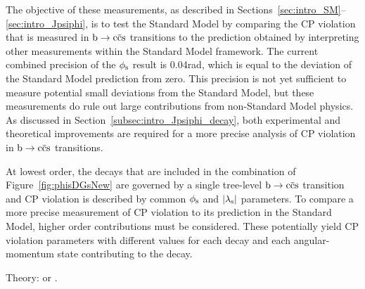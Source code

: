 The objective of these measurements, as described in Sections~\ref{sec:intro_SM}--\ref{sec:intro_Jpsiphi}, is to test the Standard Model by
comparing the CP violation that is measured in $\btoccs$ transitions to the prediction obtained by interpreting other measurements within
the Standard Model framework. The current combined precision of the $\phi_\text{s}$ result is 0.04\unitsp{}rad, which is equal to the deviation of
the Standard Model prediction from zero. This precision is not yet sufficient to measure potential small deviations from the Standard
Model, but these measurements do rule out large contributions from non-Standard Model physics. As discussed in
Section~\ref{subsec:intro_Jpsiphi_decay}, both experimental and theoretical improvements are required for a more precise analysis of CP
violation in $\btoccs$ transitions.

At lowest order, the decays that are included in the combination of Figure~\ref{fig:phisDGsNew} are governed by a single tree-level
$\btoccs$ transition and CP violation is described by common $\phi_\text{s}$ and $|{\lambda_{\text{s}}}|$ parameters. To compare a more precise measurement of CP
violation to its prediction in the Standard Model, higher order contributions must be considered. These potentially yield CP violation
parameters with different values for each decay and each angular-momentum state contributing to the \BstoJpsiKK{} decay.

Theory: \cite{Liu:2013nea} or \cite{Faller:2008gt}.
